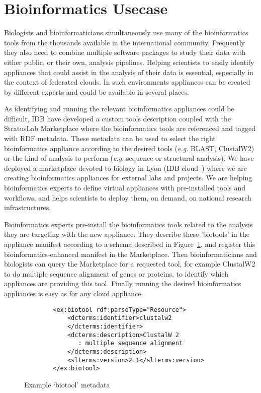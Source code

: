 \section{Bioinformatics Usecase}
\label{sec:bioinfo}

Biologists and bioinformaticians simultaneously use many of the bioinformatics tools from the thousands available in the international community. Frequently they also need to combine multiple software packages to study their data with either public, or their own, analysis pipelines. Helping scientists to easily identify appliances that could assist in the analysis of their data is essential, especially in the context of federated clouds. In such environments appliances can be created by different experts and could be available in several places.

As identifying and running the relevant bioinformatics appliances could be difficult, IDB have developed a custom tools description coupled with the StratusLab Marketplace where the bioinformatics tools are referenced and tagged with RDF metadata. These metadata can be used to select the right bioinformatics appliance according to the desired tools (\textit{e.g.} BLAST, ClustalW2) or the kind of analysis to perform (\textit{e.g.} sequence or structural analysis). We have deployed a marketplace devoted to biology in Lyon (IDB cloud~\cite{idbcloud}) where we are creating bioinformatics appliances for external labs and projects. We are helping bioinformatics experts to define virtual appliances with pre-installed tools and workflows, and helps scientists to deploy them, on demand, on national research infrastructures.

Bioinformatics experts pre-install the bioinformatics tools related to the analysis they are targeting with the new appliance. They describe these 'biotools' in the appliance manifest according to a schema described in Figure~\ref{fig:biotool-schema}, and register this bioinformatics-enhanced manifest in the Marketplace. Then bioinformaticians and biologists can query the Marketplace for a requested tool, for example ClustalW2 to do multiple sequence alignment of genes or proteins, to identify which appliances are providing this tool. Finally running the desired bioinformatics appliances is easy as for any cloud appliance.

\begin{figure}
 \begin{center}
    \small
    \begin{lstlisting}
        <ex:biotool rdf:parseType="Resource">
            <dcterms:identifier>clustalw2
            </dcterms:identifier>
            <dcterms:description>ClustalW 2
               : multiple sequence alignment
            </dcterms:description>
            <slterms:version>2.1</slterms:version>
        </ex:biotool>
    \end{lstlisting}
     \caption{Example `biotool' metadata}
    \label{fig:biotool-schema}
  \end{center}
\end{figure}
